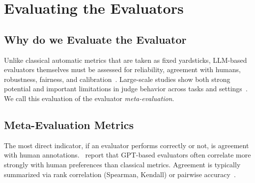 \section{Evaluating the Evaluators}

\subsection{Why do we Evaluate the Evaluator}
Unlike classical automatic metrics that are taken as fixed yardsticks, LLM-based evaluators themselves must be assessed for reliability, agreement with humans, robustness, fairness, and calibration~\cite{li2024_llmsasjudges}. Large-scale studies show both strong potential and important limitations in judge behavior across tasks and settings~\cite{bavaresco2024judgebench, zheng2023judgelm}. We call this evaluation of the evaluator \emph{meta-evaluation}.

\subsection{Meta-Evaluation Metrics}
The most direct indicator, if an evaluator performs correctly or not, is agreement with human annotations.~\cite{fu2023gptscore} report that GPT-based evaluators often correlate more strongly with human preferences than classical metrics. Agreement is typically summarized via rank correlation (Spearman, Kendall) or pairwise accuracy~\cite{li2024_llmsasjudges, bavaresco2024judgebench}.

